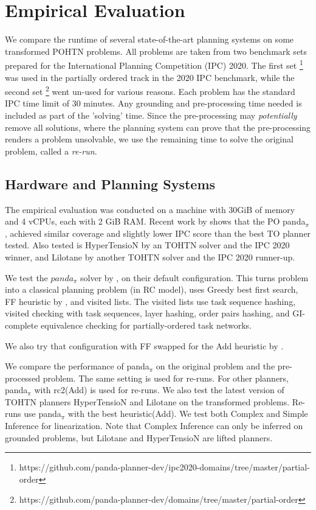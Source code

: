 \section{Empirical Evaluation}

We compare the runtime of several state-of-the-art planning systems on some transformed POHTN problems. All problems are taken from two benchmark sets prepared for the International Planning Competition (IPC) 2020. The first set \footnote{https://github.com/panda-planner-dev/ipc2020-domains/tree/master/partial-order} was used in the partially ordered track in the 2020 IPC benchmark, while the second set \footnote{https://github.com/panda-planner-dev/domains/tree/master/partial-order} went un-used for various reasons. Each problem has the standard IPC time limit of 30 minutes. Any grounding and pre-processing time needed is included as part of the 'solving' time. Since the pre-processing may \emph{potentially} remove all solutions, where the planning system can prove that the pre-processing renders a problem unsolvable, we use the remaining time to solve the original problem, called a \textit{re-run}.

\subsection{Hardware and Planning Systems}
The empirical evaluation was conducted on a machine with 30GiB of memory and 4 vCPUs, each with 2 GiB RAM. Recent work by \cite{HTN2SAS} shows that the PO panda$_\pi$, achieved similar coverage and slightly lower IPC score than the best TO planner tested. Also tested is HyperTensioN by \cite{hypertension} an TOHTN solver and the IPC 2020 winner, and Lilotane by \cite{Lilotane} another TOHTN solver and the IPC 2020 runner-up.

We test the $panda_{\pi}$ solver by \cite{useClassicalHuristicICAPS18,useClassicalHeuristicIJCAI19,progressionsearchJAIR20}, on their default configuration. This turns problem into a classical planning problem (in RC model), uses Greedy best first search, FF heuristic by \cite{FF}, and visited lists. The visited lists use task sequence hashing, visited checking with task sequences, layer hashing, order pairs hashing, and GI-complete equivalence checking for partially-ordered task networks.

We also try that configuration with FF swapped for the Add heuristic by \cite{Add}.

We compare the performance of panda$_\pi$ on the original problem and the pre-processed problem. The same setting is used for re-runs. For other planners, panda$_\pi$ with rc2(Add) is used for re-runs. We also test the latest version of TOHTN planners HyperTensioN and Lilotane on the transformed problems. Re-runs use panda$_{\pi}$ with the best heuristic(Add). We test both Complex and Simple Inference for linearization. Note that Complex Inference can only be inferred on grounded problems, but Lilotane and HyperTensioN are lifted planners.

